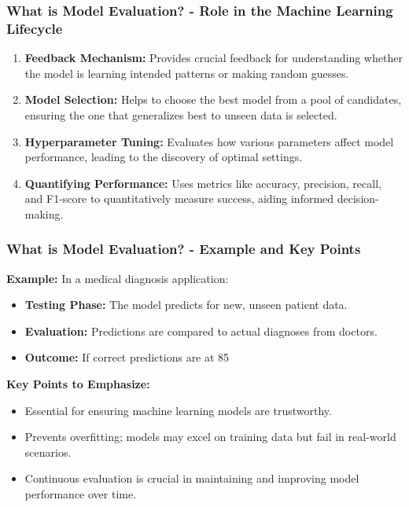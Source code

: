 \documentclass[aspectratio=169]{beamer}
\begin{document}
\begin{frame}[fragile]
    \frametitle{What is Model Evaluation? - Role in the Machine Learning Lifecycle}
    \begin{enumerate}
        \item \textbf{Feedback Mechanism:} Provides crucial feedback for understanding whether the model is learning intended patterns or making random guesses.
        \item \textbf{Model Selection:} Helps to choose the best model from a pool of candidates, ensuring the one that generalizes best to unseen data is selected.
        \item \textbf{Hyperparameter Tuning:} Evaluates how various parameters affect model performance, leading to the discovery of optimal settings.
        \item \textbf{Quantifying Performance:} Uses metrics like accuracy, precision, recall, and F1-score to quantitatively measure success, aiding informed decision-making.
    \end{enumerate}
\end{frame}

\begin{frame}[fragile]
    \frametitle{What is Model Evaluation? - Example and Key Points}
    \textbf{Example:} In a medical diagnosis application:
    \begin{itemize}
        \item \textbf{Testing Phase:} The model predicts for new, unseen patient data.
        \item \textbf{Evaluation:} Predictions are compared to actual diagnoses from doctors.
        \item \textbf{Outcome:} If correct predictions are at 85%
    \end{itemize}
    
    \textbf{Key Points to Emphasize:}
    \begin{itemize}
        \item Essential for ensuring machine learning models are trustworthy.
        \item Prevents overfitting; models may excel on training data but fail in real-world scenarios.
        \item Continuous evaluation is crucial in maintaining and improving model performance over time.
    \end{itemize}
\end{frame}
\end{document}
